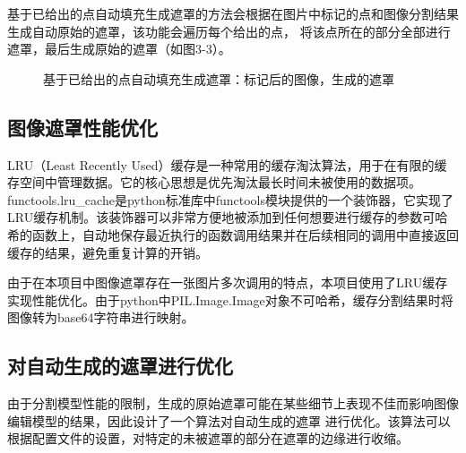 \documentclass[a4paper,AutoFakeBold,oneside,12pt]{book}
\begin{document}
基于已给出的点自动填充生成遮罩的方法会根据在图片中标记的点和图像分割结果生成自动原始的遮罩，该功能会遍历每个给出的点，
将该点所在的部分全部进行遮罩，最后生成原始的遮罩（如图3-3）。
\begin{figure}[!htbp]
    \centering
    \quad %
    \caption{基于已给出的点自动填充生成遮罩：\protect{}标记后的图像，\protect{}生成的遮罩} %
    \label{Fig:Point} 
\end{figure}

\subsection{图像遮罩性能优化}
LRU（Least Recently Used）缓存是一种常用的缓存淘汰算法，用于在有限的缓存空间中管理数据。它的核心思想是优先淘汰最长时间未被使用的数据项。
functools.lru\_cache是python标准库中functools模块提供的一个装饰器，它实现了LRU缓存机制。该装饰器可以非常方便地被添加到任何想要进行缓存的参数可哈希的函数上，自动地保存最近执行的函数调用结果并在后续相同的调用中直接返回缓存的结果，避免重复计算的开销。

由于在本项目中图像遮罩存在一张图片多次调用的特点，本项目使用了LRU缓存实现性能优化。由于python中PIL.Image.Image对象不可哈希，缓存分割结果时将图像转为base64字符串进行映射。
\subsection{对自动生成的遮罩进行优化}
由于分割模型性能的限制，生成的原始遮罩可能在某些细节上表现不佳而影响图像编辑模型的结果，因此设计了一个算法对自动生成的遮罩
进行优化。该算法可以根据配置文件的设置，对特定的未被遮罩的部分在遮罩的边缘进行收缩。
\end{document}
